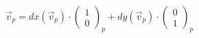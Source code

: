 \documentclass[preview]{standalone}
\begin{document}
\begin{align*}
\vec{v}_p=dx(\vec{v}_p)\cdot \begin{pmatrix}1\\ 0\end{pmatrix}_p+dy(\vec{v}_p)\cdot \begin{pmatrix}0\\ 1\end{pmatrix}_p
\end{align*}
\end{document}
